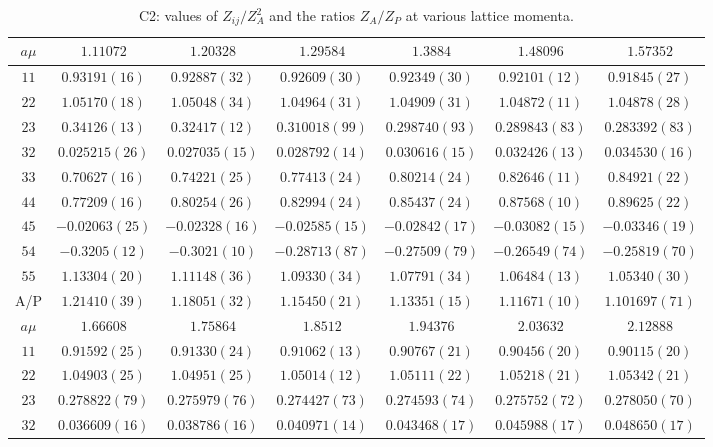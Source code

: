 \begin{table}
\begin{center}
\caption{C2: values of $Z_{ij}/Z_A^2$ and the ratios $Z_A/Z_P$ at various lattice momenta.}
\begin{tabular}{c|c c c c c c}
\hline
\hline
$a\mu$ & $1.11072$ & $1.20328$ & $1.29584$ & $1.3884$ & $1.48096$ & $1.57352$ \\
\hline
$11$ & $0.93191(16)$ & $0.92887(32)$ & $0.92609(30)$ & $0.92349(30)$ & $0.92101(12)$ & $0.91845(27)$ \\
$22$ & $1.05170(18)$ & $1.05048(34)$ & $1.04964(31)$ & $1.04909(31)$ & $1.04872(11)$ & $1.04878(28)$ \\
$23$ & $0.34126(13)$ & $0.32417(12)$ & $0.310018(99)$ & $0.298740(93)$ & $0.289843(83)$ & $0.283392(83)$ \\
$32$ & $0.025215(26)$ & $0.027035(15)$ & $0.028792(14)$ & $0.030616(15)$ & $0.032426(13)$ & $0.034530(16)$ \\
$33$ & $0.70627(16)$ & $0.74221(25)$ & $0.77413(24)$ & $0.80214(24)$ & $0.82646(11)$ & $0.84921(22)$ \\
$44$ & $0.77209(16)$ & $0.80254(26)$ & $0.82994(24)$ & $0.85437(24)$ & $0.87568(10)$ & $0.89625(22)$ \\
$45$ & $-0.02063(25)$ & $-0.02328(16)$ & $-0.02585(15)$ & $-0.02842(17)$ & $-0.03082(15)$ & $-0.03346(19)$ \\
$54$ & $-0.3205(12)$ & $-0.3021(10)$ & $-0.28713(87)$ & $-0.27509(79)$ & $-0.26549(74)$ & $-0.25819(70)$ \\
$55$ & $1.13304(20)$ & $1.11148(36)$ & $1.09330(34)$ & $1.07791(34)$ & $1.06484(13)$ & $1.05340(30)$ \\
\hline
A/P & $1.21410(39)$ & $1.18051(32)$ & $1.15450(21)$ & $1.13351(15)$ & $1.11671(10)$ & $1.101697(71)$ \\
\hline
$a\mu$ & $1.66608$ & $1.75864$ & $1.8512$ & $1.94376$ & $2.03632$ & $2.12888$ \\
\hline
$11$ & $0.91592(25)$ & $0.91330(24)$ & $0.91062(13)$ & $0.90767(21)$ & $0.90456(20)$ & $0.90115(20)$ \\
$22$ & $1.04903(25)$ & $1.04951(25)$ & $1.05014(12)$ & $1.05111(22)$ & $1.05218(21)$ & $1.05342(21)$ \\
$23$ & $0.278822(79)$ & $0.275979(76)$ & $0.274427(73)$ & $0.274593(74)$ & $0.275752(72)$ & $0.278050(70)$ \\
$32$ & $0.036609(16)$ & $0.038786(16)$ & $0.040971(14)$ & $0.043468(17)$ & $0.045988(17)$ & $0.048650(17)$ \\

\end{tabular}
\end{center}
\end{table}
